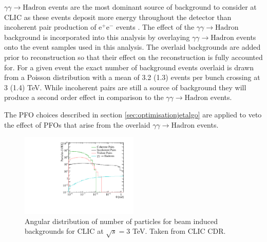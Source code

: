 $\gamma\gamma \rightarrow \text{Hadron}$ events are the most dominant source of background to consider at CLIC as these events deposit more energy throughout the detector than incoherent pair production of $\text{e}^{+}\text{e}^{-}$ events \cite{Linssen:2012hp}.  The effect of the $\gamma\gamma \rightarrow \text{Hadron}$ background is incorporated into this analysis by overlaying $\gamma\gamma \rightarrow \text{Hadron}$ events onto the event samples used in this analysis.  The overlaid backgrounds are added prior to reconstruction so that their effect on the reconstruction is fully accounted for.  For a given event the exact number of background events overlaid is drawn from a Poisson distribution with a mean of 3.2 (1.3) events per bunch crossing at 3 (1.4) TeV.  While incoherent pairs are still a source of background they will produce a second order effect in comparison to the $\gamma\gamma \rightarrow \text{Hadron}$ events.

The PFO choices described in section \ref{sec:optimisationjetalgo} are applied to veto the effect of PFOs that arise from the overlaid $\gamma\gamma \rightarrow \text{Hadron}$ events.

\begin{figure}
\includegraphics[width=0.5\textwidth]{FutureLinearColliders/Plots/CDRPlots/BackgroundAngleCut.pdf}
\caption[]{Angular distribution of number of particles for beam induced backgrounds for CLIC at $\sqrt{s} = 3$ TeV.  Taken from CLIC CDR.}
\label{fig:backgroundangle}
\end{figure}